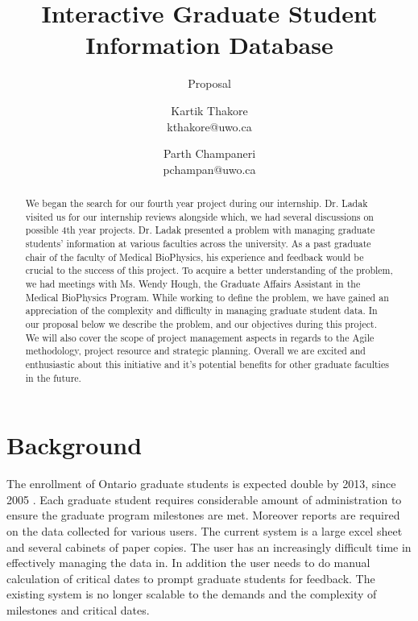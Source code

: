 \documentclass{journal}
\begin{document}

\title{Interactive Graduate Student Information Database}
\subtitle{Proposal} 
\author{Kartik Thakore\\kthakore@uwo.ca \and Parth Champaneri\\pchampan@uwo.ca}
\maketitle

\begin{abstract}
We began the search for our fourth year project during our internship. Dr. Ladak visited us for our internship reviews alongside which, we had several discussions on possible 4th year projects.  Dr. Ladak presented a problem with managing graduate students’ information at various faculties across the university. As a past graduate chair of the faculty of Medical BioPhysics, his experience and feedback would be crucial to the success of this project. To acquire a better understanding of the problem, we had meetings with Ms. Wendy Hough, the Graduate Affairs Assistant in the Medical BioPhysics Program. While working to define the problem, we have gained an appreciation of the complexity and difficulty in managing graduate student data. In our proposal below we describe the problem, and our objectives during this project. We will also cover the scope of project management aspects in regards to the Agile methodology, project resource and strategic planning. Overall we are excited and enthusiastic about this initiative and it's potential benefits for other graduate faculties in the future.
\end{abstract}

\section{Background}

The enrollment of Ontario graduate students is expected double by 2013, since 2005 \cite{con_high}.  Each graduate student requires considerable
amount of administration to ensure the graduate program milestones are met. Moreover reports are required on the data collected for various users.
The current system is a large excel sheet and several cabinets of paper copies. The user has an increasingly difficult time in effectively managing 
the data in. In addition the user needs to do manual calculation of critical dates to prompt graduate students for feedback. 
The existing system is no longer scalable to the demands and the complexity of milestones and critical dates. 
\end{document}
